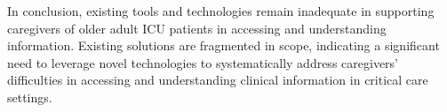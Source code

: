 In conclusion, existing tools and technologies remain inadequate in supporting caregivers of older adult ICU patients in accessing and understanding information.
Existing solutions are fragmented in scope, indicating a significant need to leverage novel technologies to systematically address caregivers' difficulties in accessing and understanding clinical information in critical care settings.







